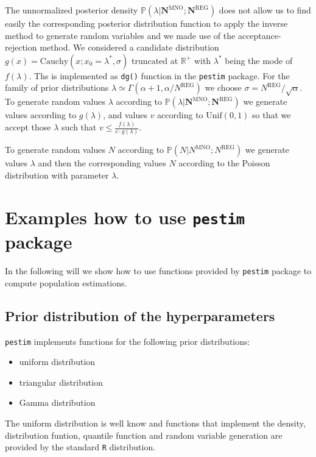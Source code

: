 \documentclass[12pt, a4paper]{article}
\begin{document}
The unnormalized posterior density $\mathbb{P}\left(\lambda|\mathbf{N}^{\textrm{MNO}};\mathbf{N}^{\textrm{REG}}\right)$ 
does not allow us to find easily the corresponding posterior distribution function to apply the inverse method to
generate random variables \cite{Dev86a} and we made use of the acceptance-rejection method. 
We considered a candidate distribution $g(x)=\textrm{Cauchy}(x; x_{0}= \lambda^{*}, \sigma)$ 
truncated at $\mathbb{R}^{+}$ with $\lambda^{*}$ being the mode of $f(\lambda)$. Ths is implemented as \texttt{dg()} 
function in the \texttt{pestim} package.
For the family of prior distributions $\lambda\simeq\Gamma(\alpha + 1, \alpha / N^{\textrm{REG}})$ we choose 
$\sigma = N^{\textrm{REG}}/\sqrt{\alpha}$.
To generate random values $\lambda$ according to $\mathbb{P}\left(\lambda|\mathbf{N}^{\textrm{MNO}};\mathbf{N}^{\textrm{REG}}\right)$ 
we generate values according to $g(\lambda)$, and values $v$ according to $\textrm{Unif}(0,1)$ so that we accept 
those $\lambda$ such that $v\leq \frac{f(\lambda)}{c\cdot g(\lambda)}$.

To generate random values $N$ according to $\mathbb{P}\left(N|N^{\textrm{MNO}};N^{\textrm{REG}}\right)$ we 
generate values $\lambda$ and then the corresponding values $N$ according to the Poisson distribution with parameter $\lambda$. 


\section{Examples how to use \texttt{pestim} package}

In the following will we show how to use functions provided by \texttt{pestim} package to compute population estimations.

\subsection{Prior distribution of the hyperparameters}
\texttt{pestim} implements functions for the following prior distributions:
\begin{itemize}
	\item uniform distribution
	\item triangular distribution
	\item Gamma distribution
\end{itemize}

The uniform distribution is well know and functions that implement the density, distribution funtion, 
quantile function and random variable generation are provided by the standard \texttt{R} distribution.
\end{document}
